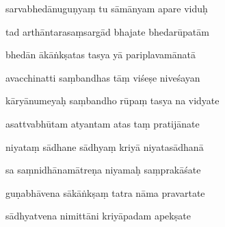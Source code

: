 \documentclass[article,12pt,a4paper]{memoir}%
\newcounter{parCount}
\begin{document}
	  
	  \pstart {} sarvabhedānuguṇyaṃ tu sāmānyam apare viduḥ 
	{}
	\pend%
      

	  
	  \pstart \leavevmode%
	tad arthāntarasaṃsargād bhajate bhedarūpatām 
	{}
	\pend%
      

	  
	  \pstart {} bhedān ākāṅkṣatas tasya yā pariplavamānatā 
	{}
	\pend%
      

	  
	  \pstart \leavevmode%
	avacchinatti saṃbandhas tāṃ viśeṣe niveśayan 
	{}
	\pend%
      

	  
	  \pstart {} kāryānumeyaḥ saṃbandho rūpaṃ tasya na vidyate 
	{}
	\pend%
      

	  
	  \pstart \leavevmode%
	asattvabhūtam atyantam atas taṃ pratijānate 
	{}
	\pend%
      

	  
	  \pstart {} niyataṃ sādhane sādhyaṃ kriyā niyatasādhanā 
	{}
	\pend%
      

	  
	  \pstart \leavevmode%
	sa saṃnidhānamātreṇa niyamaḥ saṃprakāśate 
	{}
	\pend%
      

	  
	  \pstart {} guṇabhāvena sākāṅkṣaṃ tatra nāma pravartate 
	{}
	\pend%
      

	  
	  \pstart \leavevmode%
	sādhyatvena nimittāni kriyāpadam apekṣate 
	{}
	\pend%
      
\end{document}

